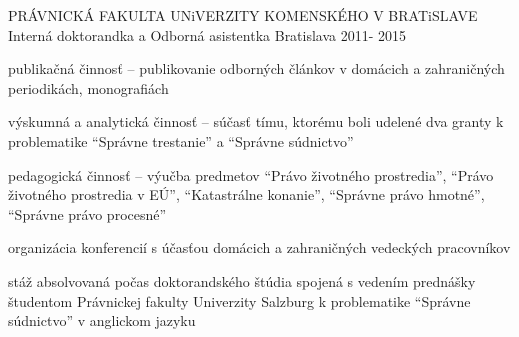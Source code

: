 \begin{cventries}
  \cventry
    {PRÁVNICKÁ FAKULTA UNiVERZITY KOMENSKÉHO V BRATiSLAVE} %
    {Interná doktorandka a Odborná asistentka} %
    {Bratislava} %
    {2011- 2015} %
    {
      \begin{cvitems} %
        \item {publikačná činnosť – publikovanie odborných článkov v domácich a zahraničných periodikách, monografiách}
        \item {výskumná a analytická činnosť – súčasť tímu, ktorému boli udelené dva granty k problematike “Správne trestanie” a “Správne súdnictvo”}
        \item {pedagogická činnosť – výučba predmetov “Právo životného prostredia”, “Právo životného prostredia v EÚ”, “Katastrálne konanie”, “Správne právo hmotné”, “Správne právo procesné”}
        \item {organizácia konferencií s účasťou domácich a zahraničných vedeckých pracovníkov}
        \item {stáž absolvovaná počas doktorandského štúdia spojená s vedením prednášky študentom Právnickej fakulty Univerzity Salzburg k problematike “Správne súdnictvo” v anglickom jazyku}
      \end{cvitems}
    }

\end{cventries}

